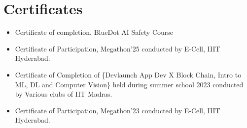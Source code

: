 \documentclass[letterpaper,11pt]{article}
\begin{document}

\section{Certificates}
\begin{itemize}
    \item Certificate of completion, BlueDot AI Safety Course
    \item Certificate of Participation, Megathon'25 conducted by E-Cell, IIIT Hyderabad.
    \item Certificate of Completion of \{Devlaunch App Dev X Block Chain, Intro to ML, DL and Computer Vision\} held during summer school 2023 conducted by Various clubs of IIT Madras.
    \item Certificate of Participation, Megathon'23 conducted by E-Cell, IIIT Hyderabad. 
\end{itemize}
\end{document}

